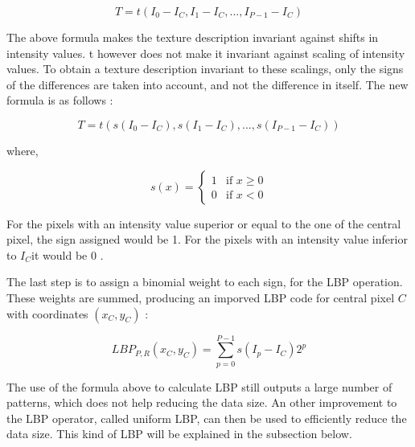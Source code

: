 \begin{equation}
   T = t(I_0 - I_C, I_1 - I_C, ..., I_{P-1} - I_C)
\end{equation}

\vspace{\baselineskip}
\noindent The above formula makes the texture description invariant against shifts in intensity values. t however does not make it invariant against scaling of intensity values. To obtain a texture description invariant to these scalings, only the signs of the differences are taken into account, and not the difference in itself. The new formula is as follows \cite{GAN08}:
\newline

\begin{equation}
   T = t(s(I_0 - I_C), s(I_1 - I_C), ..., s(I_{P-1} - I_C))
\end{equation}

\noindent where,
\newline

\begin{equation}
s(x) = \left\{
    \begin{array}{ll}
        1 & \mbox{if } x\geq0 \\
        0 & \mbox{if } x < 0
    \end{array}
\right.
\end{equation}

\vspace{\baselineskip}
\noindent For the pixels with an intensity value superior or equal to the one of the central pixel, the sign assigned would be 1. For the pixels with an intensity value inferior to $I_C$it  would be 0 \cite{GAN08}.
\newline

\noindent The last step is to assign a binomial weight to each sign, for the LBP operation. These weights are summed, producing an imporved LBP code for central pixel $ C $ with coordinates $ (x_C,y_C) $ \cite{GAN08}:
\newline

\begin{equation}
   LBP_{P,R}(x_C,y_C) = \sum_{p = 0}^{P-1} s(I_p - I_C)2^p
   \label{texture_equation}
\end{equation}

\vspace{\baselineskip}
\noindent The use of the formula above to calculate LBP still outputs a large number of patterns, which does not help reducing the data size. An other improvement to the LBP operator, called uniform LBP, can then be used to efficiently reduce the data size. This kind of LBP will be explained in the subsection below.
\newline

